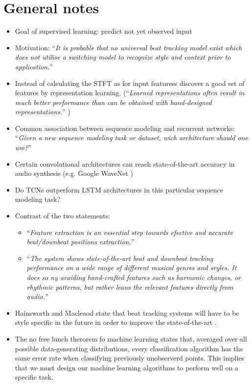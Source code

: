 \documentclass{scrartcl}
\begin{document}
\section*{General notes}
\begin{itemize}
\item Goal of supervised learning: predict not yet observed input
\item Motivation: ``\emph{It is probable that no universal beat tracking model exist which does not utilise a switching model to recognize style and context prior to application.}'' \cite[Collins2006]{Collins2006}
\item Instead of calculating the STFT as for input featuress discover a good set of features by representation learning. (``\emph{Learned representations often result in much better performance than can be obtained with hand-designed representations.}'' \cite[Goodfellow2016]{Goodfellow2016})
\item Common association between sequence modeling and recurrent networks: ``\emph{Given a new sequence modeling task or dataset, wich architecture should one use?}'' \cite[Bai2018]{Bai2018}
\item Certain convolutional architectures can reach state-of-the-art accuracy in audio synthesis (e.g. Google WaveNet \cite[Oord2016]{Oord2016})
\item Do TCNs outperform LSTM architectures in this particular sequence modeling task?
\item Contrast of the two statements:
\begin{itemize}
\item ``\emph{Feature extraction is an essential step towards efective and accurate beat/downbeat positions extraction.}'' \cite[Khadkevich2012]{Khadkevich2012}
\item ``\emph{The system shows state-of-the-art beat and downbeat tracking performance on a wide range of different musical genres and sryles. It does so ny avoiding hand-crafted features such as harmonic changes, or rhythmic patterns, but rather leans the relevant features directly from audio.}'' \cite[Boeck2016b]{Boeck2016b}
\end{itemize} 
\item Hainsworth and Macleaod state that beat tracking systems will have to be style specific in the future in order to improve the state-of-the-art \cite{Hainsworth2004}.
\item The no free lunch therorem fo machine learning \cite{Wolpert1996} states that, averaged over all possible data-generating distributions, every classification algorithm has the same error rate when classifying previously unobserverd points. This implies that we must design our machine learning algorithms to perform well on a specific task.

\end{itemize}
\end{document}
